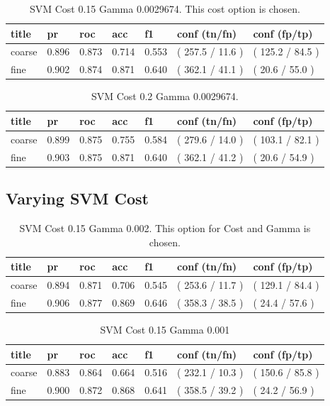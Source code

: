 \documentclass[ms]{nuthesis}
\begin{document}
\FloatBarrier
\begin{table}[H]
\centering
\caption{SVM Cost 0.15 Gamma 0.0029674. This cost option is chosen.}
\label{tab:SVM-Cp15-Gp0029674}
\begin{tabular}{|l||l||l||l||l||l||l|}\toprule
title & pr & roc & acc & f1 & conf (tn/fn) & conf (fp/tp) \\ \midrule
coarse & 0.896 & 0.873 & 0.714 & 0.553 & ( 257.5 / 11.6 ) & ( 125.2 / 84.5 ) \\
fine & 0.902 & 0.874 & 0.871 & 0.640 & ( 362.1 / 41.1 ) & ( 20.6 / 55.0 ) \\ \bottomrule
\end{tabular}
\end{table}
\FloatBarrier


\FloatBarrier
\begin{table}[H]
\centering
\caption{SVM Cost 0.2 Gamma 0.0029674.}
\label{tab:SVM-Cp2-Gp0029674}
\begin{tabular}{|l||l||l||l||l||l||l|}\toprule
title & pr & roc & acc & f1 & conf (tn/fn) & conf (fp/tp) \\ \midrule
coarse & 0.899 & 0.875 & 0.755 & 0.584 & ( 279.6 / 14.0 ) & ( 103.1 / 82.1 ) \\
fine & 0.903 & 0.875 & 0.871 & 0.640 & ( 362.1 / 41.2 ) & ( 20.6 / 54.9 ) \\ \bottomrule
\end{tabular}
\end{table}
\FloatBarrier

\subsection{Varying SVM Cost}

\FloatBarrier
\begin{table}[H]
\centering
\caption{SVM Cost 0.15 Gamma 0.002. This option for Cost and Gamma is chosen.}
\label{tab:SVM-Cp15-Gp002}
\begin{tabular}{|l||l||l||l||l||l||l|}\toprule
title & pr & roc & acc & f1 & conf (tn/fn) & conf (fp/tp) \\ \midrule
coarse & 0.894 & 0.871 & 0.706 & 0.545 & ( 253.6 / 11.7 ) & ( 129.1 / 84.4 ) \\
fine & 0.906 & 0.877 & 0.869 & 0.646 & ( 358.3 / 38.5 ) & ( 24.4 / 57.6 ) \\ \bottomrule
\end{tabular}
\end{table}
\FloatBarrier

\FloatBarrier
\begin{table}[H]
\centering
\caption{SVM Cost 0.15 Gamma 0.001}
\label{tab:SVM-Cp15-Gp001}
\begin{tabular}{|l||l||l||l||l||l||l|}\toprule
title & pr & roc & acc & f1 & conf (tn/fn) & conf (fp/tp) \\ \midrule
coarse & 0.883 & 0.864 & 0.664 & 0.516 & ( 232.1 / 10.3 ) & ( 150.6 / 85.8 ) \\
fine & 0.900 & 0.872 & 0.868 & 0.641 & ( 358.5 / 39.2 ) & ( 24.2 / 56.9 ) \\ \bottomrule
\end{tabular}
\end{table}
\FloatBarrier
\end{document}
